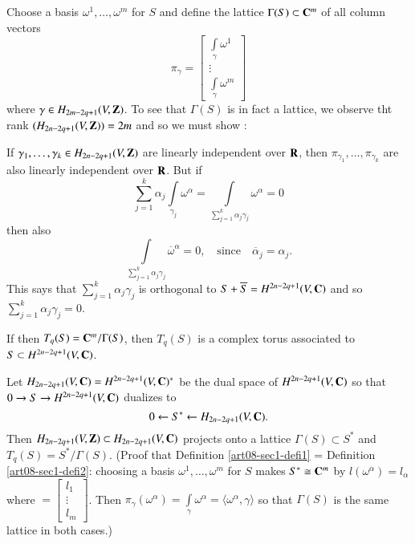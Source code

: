 \begin{definition}\label{art08-sec1-defi1}
Choose a basis $\omega^{1},\ldots,\omega^{m}$ for $S$ and define the lattice $\Gamma(S)\subset \mathbf{C}^{m}$ of all column vectors 
$$
\pi_{\gamma}=\left[\begin{smallmatrix} \int\limits_{\gamma}\omega^{1}\\ \vdots\\ \int\limits_{\gamma}\omega^{m}\end{smallmatrix}\right]
$$ 
where $\gamma\in H_{2m-2q+1}(V,\mathbf{Z})$. To see that $\Gamma(S)$ is in fact a lattice, we observe tht rank $(H_{2n-2q+1}(V,\mathbf{Z}))=2m$ and so we must show :
\end{definition}

If $\gamma_{1},\ldots,\gamma_{k}\in H_{2n-2q+1}(V,\mathbf{Z})$ are linearly independent over $\mathbf{R}$, then $\pi_{\gamma_{1}},\ldots,\pi_{\gamma_{k}}$ are also linearly independent over $\mathbf{R}$. But if 
$$
\sum\limits^{k}_{j=1}\alpha_{j}\int\limits_{\gamma_{j}}\omega^{\alpha}=\int\limits_{\sum\limits^{k}_{j=1}\alpha_{j}\gamma_{j}} \omega^{\alpha}=0
$$\pageoriginale
then also
$$
\int\limits_{\sum\limits^{k}_{j=1}\alpha_{j}\gamma_{j}}\overline{\omega}^{\alpha}=0,\quad\text{since}\quad \overline{\alpha}_{j}=\alpha_{j}.
$$
This says that $\sum\limits^{k}_{j=1}\alpha_{j}\gamma_{j}$ is orthogonal to $S+\overline{S}=H^{2n-2q+1}(V,\mathbf{C})$ and so $\sum\limits^{k}_{j=1}\alpha_{j}\gamma_{j}=0$.

If then $T_{q}(S)=\mathbf{C}^{m}/\Gamma(S)$, then $T_{q}(S)$ is a complex torus associated to $S\subset H^{2n-2q+1}(V,\mathbf{C})$.

\begin{definition}\label{art08-sec1-defi2}
Let $H_{2n-2q+1}(V,\mathbf{C})=H^{2n-2q+1}(V,\mathbf{C})^{*}$ be the dual space of $H^{2n-2q+1}(V,\mathbf{C})$ so that $0\to S\to H^{2n-2q+1}(V,\mathbf{C})$ dualizes to 
\begin{equation}
0\leftarrow S^{*}\leftarrow H_{2n-2q+1}(V,\mathbf{C}).\label{art08-sec1-eq1.5}
\end{equation}
Then $H_{2n-2q+1}(V,\mathbf{Z})\subset H_{2n-2q+1}(V,\mathbf{C})$ projects onto a lattice $\Gamma(S)\subset S^{*}$ and $T_{q}(S)=S^{*}/\Gamma(S)$. (Proof that Definition \ref{art08-sec1-defi1} = Definition \ref{art08-sec1-defi2}: choosing a basis $\omega^{1},\ldots,\omega^{m}$ for $S$ makes $S^{*}\cong \mathbf{C}^{m}$ by $l(\omega^{\alpha})=l_{\alpha}$ where $=\left[\begin{smallmatrix} l_{1}\\ \vdots \\ l_{m}\end{smallmatrix}\right]$. Then $\pi_{\gamma}(\omega^{\alpha})=\int\limits_{\gamma}\omega^{\alpha}=\langle \omega^{\alpha},\gamma\rangle$ so that $\Gamma(S)$ is the same lattice in both cases.)
\end{definition}

